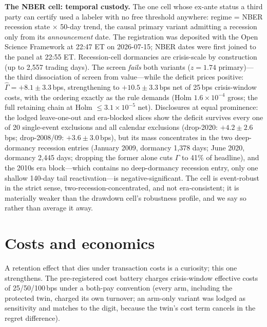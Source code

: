 \documentclass[sigconf,anonymous]{acmart}
\newcommand{\G}{\hat\Gamma}
\begin{document}
\textbf{The NBER cell: temporal custody.} The one cell whose ex-ante
status a third party can certify used a labeler with no free threshold
anywhere: regime = NBER recession state $\times$ 50-day trend, the
causal primary variant admitting a recession only from its
\emph{announcement} date. The registration was deposited with the Open
Science Framework at 22:47 ET on 2026-07-15; NBER dates were first
joined to the panel at 22:55 ET. Recession-cell dormancies are
crisis-scale by construction (up to 2{,}557 trading days). The screen
\emph{fails} both variants ($z = 1.74$ primary)---the third
dissociation of screen from value---while the deficit prices positive:
$\G = +8.1 \pm 3.3$\,bps, strengthening to $+10.5 \pm 3.3$\,bps
net of 25\,bps crisis-window costs, with the ordering exactly as the
rule demands (Holm $1.6{\times}10^{-4}$ gross; the full retaining chain
at Holm $\le 3.1{\times}10^{-5}$ net). Disclosures at equal prominence:
the lodged leave-one-out and era-blocked slices show the deficit
survives every one of 20 single-event exclusions and all calendar
exclusions (drop-2020: $+4.2 \pm 2.6$\,bps; drop-2008/09:
$+3.6 \pm 3.0$\,bps), but its mass concentrates in the two
deep-dormancy recession entries (January 2009, dormancy 1{,}378 days;
June 2020, dormancy 2{,}445 days; dropping the former alone cuts $\G$
to 41\% of headline), and the 2010s era block---which contains no
deep-dormancy recession entry, only one shallow 140-day tail
reactivation---is negative-significant. The cell is
event-robust in the strict sense, two-recession-concentrated, and not
era-consistent; it is materially weaker than the drawdown cell's
robustness profile, and we say so rather than average it away.

\section{Costs and economics}
\label{sec:costs}

A retention effect that dies under transaction costs is a curiosity;
this one strengthens. The pre-registered cost battery charges
crisis-window effective costs of 25/50/100\,bps under a both-pay
convention (every arm, including the protected twin, charged its own
turnover; an arm-only variant was lodged as sensitivity and matches to
the digit, because the twin's cost term cancels in the regret
difference).
\end{document}
